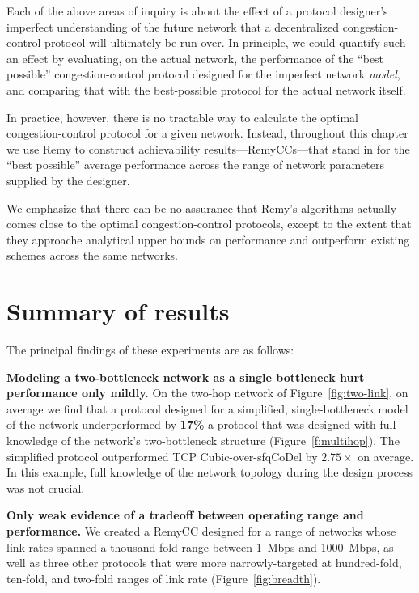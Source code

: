 Each of the above areas of inquiry is about the effect of a protocol
designer's imperfect understanding of the future network that a
decentralized congestion-control protocol will ultimately be run
over. In principle, we could quantify such an effect by evaluating, on
the actual network, the performance of the ``best possible''
congestion-control protocol designed for the imperfect network
\emph{model}, and comparing that with the best-possible protocol for
the actual network itself.

In practice, however, there is no tractable way to calculate the
optimal congestion-control protocol for a given network. Instead,
throughout this chapter we use Remy to construct achievability
results---RemyCCs---that stand in for the ``best possible'' average
performance across the range of network parameters supplied by the
designer.

We emphasize that there can be no assurance that Remy's algorithms
actually comes close to the optimal congestion-control protocols,
except to the extent that they approache analytical upper bounds on
performance and outperform existing schemes across the same networks.

\section{Summary of results}

The principal findings of these experiments are as follows:

\vspace{\baselineskip}

\noindent 
\textbf{Modeling a two-bottleneck network as a single bottleneck hurt
  performance only mildly.}  On the two-hop network of
Figure~\ref{fig:two-link}, on average we find that a protocol designed
for a simplified, single-bottleneck model of the network
underperformed by {\bf 17\%} a protocol that was designed with full
knowledge of the network's two-bottleneck structure
(Figure~\ref{f:multihop}). The simplified protocol outperformed TCP
Cubic-over-sfqCoDel by $2.75\times$ on average. In this example, full
knowledge of the network topology during the design process was not
crucial.

\vspace{\baselineskip}

\noindent 
\textbf{Only weak evidence of a tradeoff between
  operating range and performance.} We created a RemyCC designed
for a range of networks whose link rates spanned a thousand-fold range
between 1~Mbps and 1000~Mbps, as well as three other protocols that
were more narrowly-targeted at hundred-fold, ten-fold, and two-fold
ranges of link rate (Figure~\ref{fig:breadth}).

